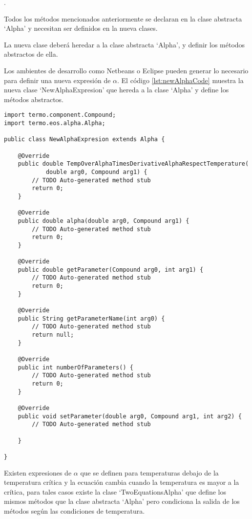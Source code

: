 	.

	Todos los métodos mencionados anteriormente se declaran en la clase abstracta `Alpha' y necesitan ser definidos en la nueva clases. 

	La nueva clase deberá heredar a la clase abstracta `Alpha', y definir los métodos abstractos de ella. 

	Los ambientes de desarrollo como Netbeans o Eclipse pueden generar lo necesario para definir una nueva expresión de $\alpha$. El código \ref{lst:newAlphaCode} muestra la nueva clase `NewAlphaExpresion' que hereda a la clase `Alpha' y define los métodos abstractos.


	\begin{lstlisting}[caption={Esqueleto para la creación de una nueva expresión de $\alpha$ para la librería materia, generado con el ambiente de desarrollo Eclipse},label={lst:newAlphaCode}]
import termo.component.Compound;
import termo.eos.alpha.Alpha;

public class NewAlphaExpresion extends Alpha {

	@Override
	public double TempOverAlphaTimesDerivativeAlphaRespectTemperature(
			double arg0, Compound arg1) {
		// TODO Auto-generated method stub
		return 0;
	}

	@Override
	public double alpha(double arg0, Compound arg1) {
		// TODO Auto-generated method stub
		return 0;
	}

	@Override
	public double getParameter(Compound arg0, int arg1) {
		// TODO Auto-generated method stub
		return 0;
	}

	@Override
	public String getParameterName(int arg0) {
		// TODO Auto-generated method stub
		return null;
	}

	@Override
	public int numberOfParameters() {
		// TODO Auto-generated method stub
		return 0;
	}

	@Override
	public void setParameter(double arg0, Compound arg1, int arg2) {
		// TODO Auto-generated method stub

	}

}

	\end{lstlisting}

	Existen expresiones de $\alpha$ que se definen para temperaturas debajo de la temperatura crítica y la ecuación cambia cuando la temperatura es mayor a la crítica, para tales casos existe la clase `TwoEquationsAlpha' que define los mismos métodos que la clase abstracta `Alpha' pero condiciona la salida de los métodos según las condiciones de temperatura. 

